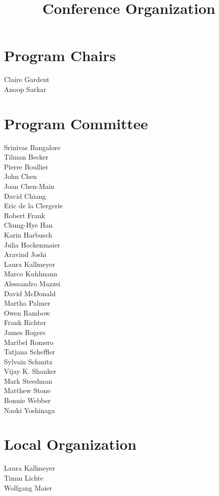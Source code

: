\documentclass{article}
\begin{document}
\title{Conference Organization}
\author{}
\maketitle
\vspace*{-2em}

\section*{Program Chairs}
\noindent
Claire Gardent\\
Anoop Sarkar

\section*{Program Committee}
\noindent
Srinivas Bangalore\\
Tilman Becker\\
Pierre Boullier\\
John Chen\\
Joan Chen-Main\\
David Chiang\\
Eric de la Clergerie\\
Robert Frank\\
Chung-Hye Han\\
Karin Harbusch\\
Julia Hockenmaier\\
Aravind Joshi\\
Laura Kallmeyer\\
Marco Kuhlmann\\
Alessandro Mazzei\\
David McDonald\\
Martha Palmer\\
Owen Rambow\\
Frank Richter\\
James Rogers\\
Maribel Romero\\
Tatjana Scheffler\\
Sylvain Schmitz\\
Vijay K. Shanker\\
Mark Steedman\\
Matthew Stone\\
Bonnie Webber\\
Naoki Yoshinaga

\section*{Local Organization}
\noindent
Laura Kallmeyer\\
Timm Lichte \\
Wolfgang Maier
\end{document}
